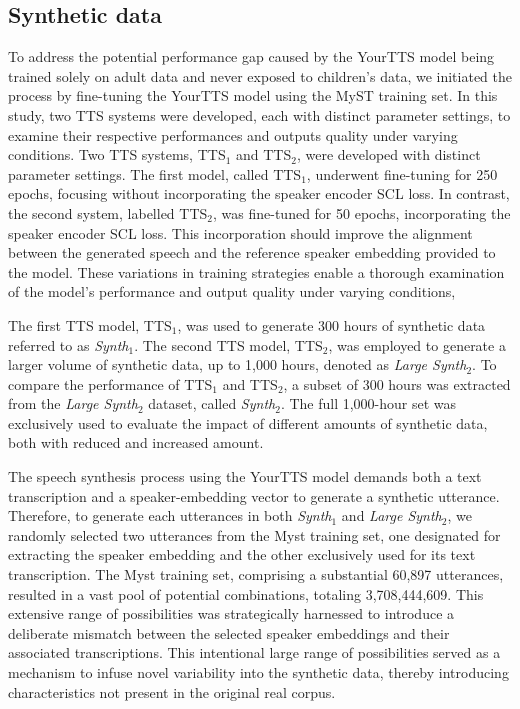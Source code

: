 \subsection{Synthetic data}
To address the potential performance gap caused by the YourTTS model being trained solely on adult data and never exposed to children's data, we initiated the process by fine-tuning the YourTTS model using the MyST training set. In this study, two TTS systems were developed, each with distinct parameter settings, to examine their respective performances and outputs quality under varying conditions. Two TTS systems, TTS$_1$ and TTS$_2$, were developed with distinct parameter settings. The first model, called TTS$_1$, underwent fine-tuning for 250 epochs, focusing without incorporating the speaker encoder SCL loss. In contrast, the second system, labelled TTS$_2$, was fine-tuned for 50 epochs, incorporating the speaker encoder SCL loss. This incorporation should improve the alignment between the generated speech and the reference speaker embedding provided to the model. These variations in training strategies enable a thorough examination of the model's performance and output quality under varying conditions,

The first TTS model, TTS$_1$, was used to generate 300 hours of synthetic data referred to as \textit{Synth$_1$}. The second TTS model, TTS$_2$, was employed to generate a larger volume of synthetic data, up to 1,000 hours, denoted as \textit{Large Synth$_2 $}. To compare the performance of TTS$_1$ and TTS$_2$, a subset of 300 hours was extracted from the \textit{Large Synth$_2$} dataset, called \textit{Synth$_2$}. The full 1,000-hour set was exclusively used to evaluate the impact of different amounts of synthetic data, both with reduced and increased amount.

The speech synthesis process using the YourTTS model demands both a text transcription and a  speaker-embedding vector to generate a synthetic utterance. Therefore, to generate each utterances in both \textit{Synth$_1$} and \textit{Large Synth$_2$}, we randomly selected two utterances from the Myst training set, one designated for extracting the speaker embedding and the other exclusively used for its text transcription. The Myst training set, comprising a substantial 60,897 utterances, resulted in a vast pool of potential combinations, totaling 3,708,444,609. This extensive range of possibilities was strategically harnessed to introduce a deliberate mismatch between the selected speaker embeddings and their associated transcriptions. This intentional large range of possibilities served as a mechanism to infuse novel variability into the synthetic data, thereby introducing characteristics not present in the original real corpus.

